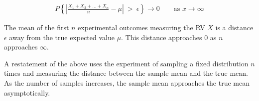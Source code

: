 \begin{align}
	P \left\{ \left| \frac{ X_1 + X_2 + \dots + X_n }{n} - \mu \right|\  >\ \epsilon \right\} \to 0 \qquad
	\text{as } x \to \infty
\end{align}

The mean of the first $ n $ experimental outcomes measuring the RV $ X $ is a distance $ \epsilon $ away from the true expected value $ \mu $. This distance approaches $ 0 $ as $ n $ approaches $ \infty $.

A restatement of the above uses the experiment of sampling a fixed distribution $ n $ times and measuring the distance between the sample mean and the true mean. As the number of samples increases, the sample mean approaches the true mean asymptotically.
\newpage
